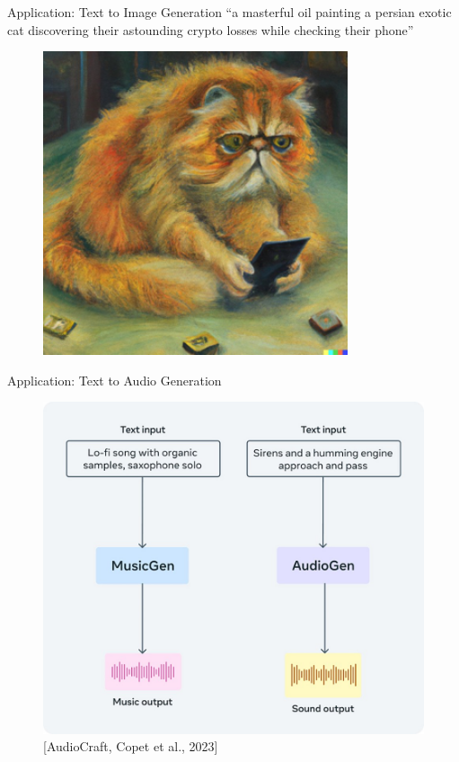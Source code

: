 \begin{frame}{Application: Text to Image Generation}
    \centering
    “a masterful oil painting a persian exotic cat discovering their astounding crypto losses while checking their phone”
    \begin{figure}
    \centering
    \includegraphics[width=0.8\textwidth,height=0.75\textheight,keepaspectratio]{images/dul/slide_29_1_img.png}
    \end{figure}
\end{frame}

\begin{frame}[allowframebreaks]{Application: Text to Audio Generation}
    \begin{figure}
    \centering
    \includegraphics[height=0.8\textheight]{images/dul/slide_34_1_img.png}
    \caption*{[AudioCraft, Copet et al., 2023]}
    \end{figure}
\end{frame}

